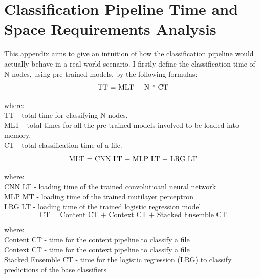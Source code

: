 

\chapter{Classification Pipeline Time and Space Requirements Analysis}

This appendix aims to give an intuition of how the classification pipeline would actually behave in a real world scenario. I firstly define the classification time of N nodes, using pre-trained models, by the following formulas: \\

    \begin{equation}
        \centering
        \text{TT = MLT  + N * CT}
    \end{equation}
    
    where: \\
    TT - total time for classifying N nodes. \\
    MLT - total times for all the pre-trained models involved to be loaded into memory. \\
    CT - total classification time of a file. \\
    
    \begin{equation}
        \centering
        \text{MLT = CNN LT + MLP LT + LRG LT} 
    \end{equation}
    
    where: \\
    CNN LT - loading time of the trained convolutioanl neural network \\
    MLP MT - loading time of the trained mutilayer perceptron \\
    LRG LT - loading time of the trained logistic regression model \\
    
    \begin{equation}
        \text{CT = Content CT + Context CT + Stacked Ensemble CT}
    \end{equation} \label{CT}
    
    where: \\
    Content CT - time for the content pipeline to classify a file \\
    Context CT - time for the context pipeline to classify a file \\
    Stacked Ensemble CT - time for the logistic regression (LRG) to classify predictions of the base classifiers \\
    
